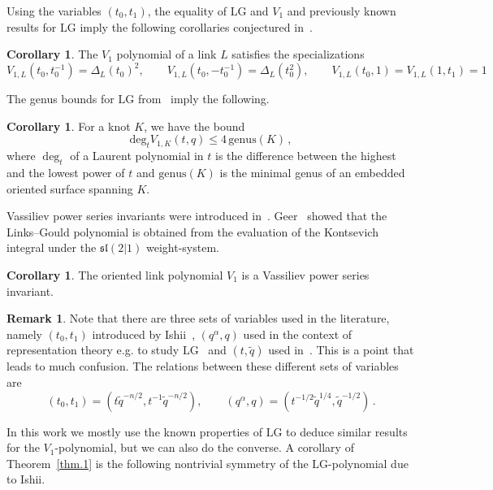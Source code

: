 \documentclass[12pt,reqno]{amsart}
\theoremstyle{definition}
\newtheorem{remark}[theorem]{Remark}
\newtheorem{corollary}[theorem]{Corollary}
\def\tq{\tilde{q}}
\def\a{\alpha}
\def\be{\begin{equation}}
\def\ee{\end{equation}}
\def\LG{\mathrm{LG}}
\begin{document}
Using the variables $(t_0,t_1)$, the equality of $\LG$ and $V_1$ and previously
known results for $\LG$ \cite{DWIL, Ish, Ko, KoPat} imply the following
corollaries conjectured in~\cite{GK:multi}.

\begin{corollary}
The $V_1$ polynomial of a link $L$ satisfies the specializations
\be
\label{special}
V_{1,L}(t_0 , t_0^{-1}) = \Delta_L(t_0)^2,
\qquad V_{1,L}(t_0 , -t_0^{-1}) = \Delta_L(t_0^2),
\qquad V_{1,L}(t_0,1) = V_{1,L}(1,t_1) = 1
\ee
\end{corollary}

The genus bounds for $\LG$ from~\cite{KT} imply the following.

\begin{corollary}
For a knot $K$, we have the bound 
\be
\mathrm{deg}_t V_{1,K}(t,q) \leq 4 \, \text{genus}(K) \,,
\ee
where $\deg_t$ of a Laurent polynomial in $t$ is the difference between the highest and the lowest power of $t$ and $\text{genus}(K)$ is the minimal genus
of an embedded oriented surface spanning $K$. 
\end{corollary}

Vassiliev power series invariants were introduced in~\cite{BG:MMR}.
Geer~\cite{Geer:vas} showed that the Links--Gould polynomial is obtained from
the evaluation of the Kontsevich integral under the $\mathfrak{sl}(2|1)$ weight-system. 

\begin{corollary}
\label{cor.vassiliev}  
The oriented link polynomial $V_1$ is a Vassiliev power series invariant.
\end{corollary}

\begin{remark}
\label{rem.1} 
Note that there are three sets of variables used in the literature, namely
$(t_0,t_1)$ introduced by Ishii~\cite{Ish}, $(q^\a,q)$ used in the
context of representation theory e.g. to study $\LG$~\cite{LG, KT} and $(t,\tq)$
used in~\cite{GK:multi}. This is a point that leads to much confusion. The
relations between these different sets of variables are
\be
\label{variables}
(t_0, t_1)=(t \tq^{-n/2}, t^{-1}\tq^{-n/2}),
\qquad (q^\a,q) = (t^{-1/2} \tq^{1/4}, \tq^{-1/2}) \,. 
\ee
\end{remark}  

In this work we mostly use the known properties of $\LG$ to deduce similar
results for the $V_1$-polynomial, but we can also do the converse. A corollary of
Theorem~\ref{thm.1} is the following nontrivial symmetry of the
$\LG$-polynomial due to Ishii. 
\end{document}
